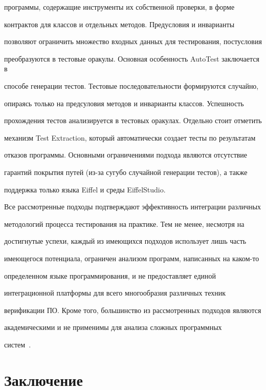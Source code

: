 программы, содержащие инструменты их собственной проверки, в форме


контрактов для классов и отдельных методов. Предусловия и инварианты


позволяют ограничить множество входных данных для тестирования, постусловия


преобразуются в тес\-то\-вые оракулы. Основная особенность AutoTest заключается в


способе генерации тестов. Тестовые последовательности формируются случайно,


опираясь только на предсуловия методов и инварианты классов. Успешность


прохождения тес\-тов анализируется в тес\-то\-вых оракулах. Отдельно стоит отметить


механизм Test Extraction, который автоматически создает тес\-ты по результатам


отказов программы. Основными ограничениями подхода являются отсутствие


гарантий покрытия путей (из-за сугубо случайной генерации тес\-тов), а также


поддержка только языка Eiffel и среды EiffelStudio.





Все рассмотренные подходы подтверждают эффективность интеграции различных


методологий процесса тестирования на практике. Тем не менее, несмотря на


достигнутые успехи, каждый из имеющихся подходов использует лишь часть


имеющегося потенциала, ограничен анализом программ, написанных на каком-то


определенном языке программирования, и не предоставляет единой


интеграционной платформы для всего многообразия различных техник


верификации ПО. Кроме того, большинство из рассмотренных подходов являются


академическими и не применимы для анализа сложных программных


систем~\cite{14-andr, 13-andr}.











      \section{Заключение}





